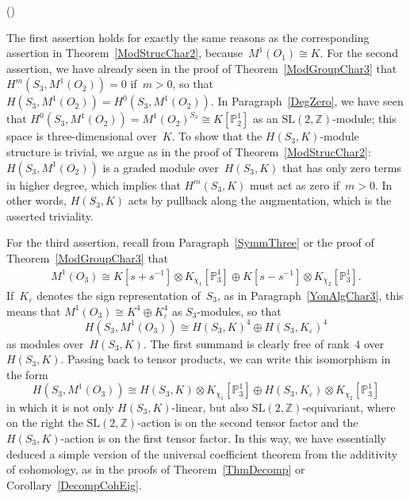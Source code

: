 \documentclass[12pt]{article}
\makeatletter
\newcounter{num}
\newenvironment{pflist}{\begin{list}{(\arabic{num})}{\usecounter{num} \leftmargin0cm \itemindent5pt}}{\end{list}}
\theoremstyle{definition}
\theoremstyle{break}
\renewenvironment{proof}[1][\proofname]{\par
\vspace{-5pt}%
\pushQED{\qed}%
\normalfont
\topsep0pt \partopsep0pt %
\trivlist
\item[\hskip\labelsep
\bfseries
#1\@addpunct{.}]\ignorespaces
}{%
\popQED\endtrivlist\@endpefalse
\addvspace{6pt plus 6pt} %
}
\newcommand{\Z}{\mathbb{Z}}
\newcommand{\SL}{\mathrm{SL}}
\renewcommand{\P}{\mathbb{P}}
\renewcommand{\1}{\mathbbm{1}}
\renewcommand{\P}{\mathbb{P}}
\newcommand{\ot}{\mathbin{\otimes}}
\makeatother
\begin{document}
\begin{proof}
\begin{pflist}
\item
The first assertion holds for exactly the same reasons as the corresponding assertion in Theorem~\ref{ModStrucChar2}, because~$M^1(O_1) \cong K$. For the second assertion, we have already seen in the proof of Theorem~\ref{ModGroupChar3} that \mbox{$H^m(S_3, M^1(O_2)) = 0$} if~$m>0$, so that
$H(S_3, M^1(O_2)) = H^0(S_3, M^1(O_2))$. In Paragraph~\ref{DegZero}, we have seen that $H^0(S_3, M^1(O_2)) = M^1(O_2)^{S_3} \cong K[\P^1_2]$ as an $\SL(2, \Z)$-module; this space is three-dimensional over~$K$. To show that the
$H(S_3, K)$-module structure is trivial, we argue as in the proof of Theorem~\ref{ModStrucChar2}: $H(S_3, M^1(O_2))$ is a graded module over~$H(S_3, K)$ that has only zero terms in higher degree, which implies that $H^m(S_3, K)$ must act as zero if~$m>0$. In other words, $H(S_3, K)$ acts by pullback along the augmentation, which is the asserted triviality.

\item
For the third assertion, recall from Paragraph~\ref{SymmThree} or the proof of Theorem~\ref{ModGroupChar3} that
\begin{align*}
M^1(O_3)
\cong K[s + s^{-1}] \ot K_{\chi_1}[\P_3^{1}] \oplus K[s - s^{-1}] \ot K_{\chi_2}[\P_3^{1}].
\end{align*}
If~$K_\varepsilon$ denotes the sign representation of~$S_3$, as in Paragraph~\ref{YonAlgChar3}, this means that $M^1(O_3) \cong K^4 \oplus K_\varepsilon^4$ as $S_3$-modules, so that
\[H(S_3, M^1(O_3)) \cong H(S_3, K)^4 \oplus H(S_3, K_\varepsilon)^4\]
as modules over~$H(S_3, K)$. The first summand is clearly free of rank~$4$ over~$H(S_3, K)$. Passing back to tensor products, we can write this isomorphism in the form
\[H(S_3, M^1(O_3)) \cong H(S_3, K) \ot K_{\chi_1}[\P_3^{1}] \oplus H(S_3, K_\varepsilon) \ot K_{\chi_2}[\P_3^{1}]\]
in which it is not only $H(S_3, K)$-linear, but also $\SL(2, \Z)$-equivariant, where on the right the $\SL(2, \Z)$-action is on the second tensor factor and the $H(S_3, K)$-action is on the first tensor factor. In this way, we have essentially deduced a simple version of the universal coefficient theorem from the additivity of cohomology, as in the proofs of Theorem~\ref{ThmDecomp} or Corollary~\ref{DecompCohEig}.
\qedhere
\end{pflist}
\end{proof}
\end{document}
